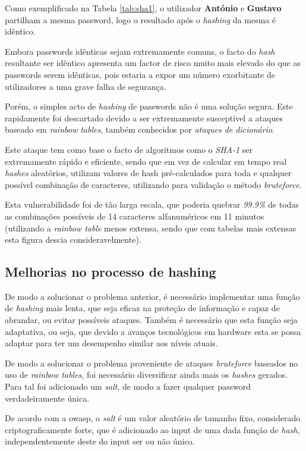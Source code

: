 Como exemplificado na Tabela \ref{tab:sha1}, o utilizador \textbf{António} e \textbf{Gustavo} partilham a mesma password, logo o resultado após o \emph{hashing} da mesma é idêntico. 

Embora passwords idênticas sejam extremamente comuns, o facto do \emph{hash} resultante ser idêntico apresenta um factor de risco muito mais elevado do que as passwords serem idênticas, pois estaria a expor um número exorbitante de utilizadores a uma grave falha de segurança.

Porém, o simples acto de \emph{hashing} de passwords não é uma solução segura. Este rapidamente foi descartado devido a ser extremamente susceptível a ataques baseado em \emph{rainbow tables}, também conhecidos por \emph{ataques de dicionário}.

Este ataque tem como base o facto de algoritmos como o \emph{SHA-1} ser extremamente rápido e eficiente, sendo que em vez de calcular em tempo real \emph{hashes} aleatórios, utilizam valores de hash pré-calculados para toda e qualquer possível combinação de caracteres, utilizando para validação o método \emph{bruteforce}.

Esta vulnerabilidade foi de tão larga escala, que poderia quebrar \emph{99.9\%} de todas as combinações possíveis de 14 caracteres alfanuméricos em 11 minutos (utilizando a \emph{rainbow table} menos extensa, sendo que com tabelas mais extensas esta figura descia consideravelmente).

\cleardoublepage
\subsection{Melhorias no processo de hashing}

De modo a solucionar o problema anterior, é necessário implementar uma função de \emph{hashing} mais lenta, que seja eficaz na proteção de informação e capaz de abrandar, ou evitar possíveis ataques. Também é necessário que esta função seja adaptativa, ou seja, que devido a avanços tecnológicos em hardware esta se possa adaptar para ter um desempenho similar aos níveis atuais.

De modo a solucionar o problema proveniente de ataques \emph{bruteforce} baseados no uso de \emph{rainbow tables}, foi necessário diversificar ainda mais os \emph{hashes} gerados. Para tal foi adicionado um \emph{salt}\cite{sriramya2015providing}, de modo a fazer qualquer password verdadeiramente única.

De acordo com a \gls{owasp}, o \emph{salt} é um valor aleatório de tamanho fixo, considerado criptograficamente forte, que é adicionado ao input de uma dada função de \emph{hash}, independentemente deste do input ser ou não único.

